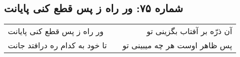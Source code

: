 \begin{center}
\section*{شماره ۷۵: ور راه ز پس قطع کنی پایانت}
\label{sec:075}
\begin{longtable}{l p{0.5cm} r}
ور راه ز پس قطع کنی پایانت
&&
آن ذرّه بر آفتاب بگزینی تو
\\
تا خود به کدام ره درافتد جانت
&&
پس ظاهر اوست هر چه میبینی تو
\\
\end{longtable}
\end{center}
